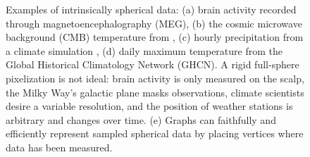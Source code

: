 \documentclass{article} %
\newcommand{\todo}[1]{{\color[rgb]{.6,.1,.6}{#1}}}
\begin{document}
\begin{figure}[h]
	\centering
	 \hspace{0.1em}
	 \hfill
	 \hfill
	 \hfill
	\caption{
		Examples of intrinsically spherical data:
		(a) brain activity recorded through magnetoencephalography (MEG),\protect\footnotemark
		(b) the cosmic microwave background (CMB) temperature from \citet{planck2015overview},
		(c) hourly precipitation from a climate simulation \citep{jiang2019sphericalcnn}, %
		(d) daily maximum temperature from the Global Historical Climatology Network (GHCN).\protect\footnotemark
		A rigid full-sphere pixelization is not ideal: brain activity is only measured on the scalp, the Milky Way's galactic plane masks observations, climate scientists desire a variable resolution, and the position of weather stations is arbitrary and changes over time.
		(e) Graphs can faithfully and efficiently represent sampled spherical data by placing vertices where data has been measured.
	}
	\label{fig:examples}
\end{figure}
\end{document}
